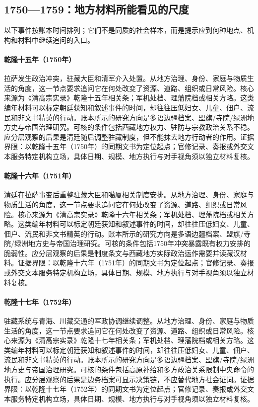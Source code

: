 \subsection{1750—1759：地方材料所能看见的尺度}
以下事件按账本时间排列；它们不是同质的社会样本，而是提示应到何种地点、机构和材料中继续追问的入口。
\hypertarget{social:EQ-1750-LHASA-UPRISING}{}\paragraph{乾隆十五年（1750年）}拉萨发生政治冲突，驻藏大臣和清军介入处置。从地方治理、身份、家庭与物质生活的角度，这一节点要求追问它在何处改变了资源、道路、组织或日常风险。核心来源为《清高宗实录》乾隆十五年相关条；军机处档、理藩院档或相关方略。这类编年材料可以标定朝廷获知和叙述事件的时间，却往往压低妇女、儿童、佃户、流民和非文书精英的行动。账本所示的研究方向是多语边疆档案、盟旗/寺院/绿洲地方史与帝国治理研究。可核的条件包括西藏地方权力、驻防与宗教政治关系不稳。应分层观察的后果是清廷随后调整驻藏制度，但不能抹去地方行动者的作用。证据界限：以乾隆十五年（1750年）的同期文书为定位起点；官修记录、奏报或外交文本服务特定机构立场，具体日期、规模、地方执行与对手视角须以独立材料复核。
\hypertarget{social:EQ-1751-TIBET-ORDINANCE}{}\paragraph{乾隆十六年（1751年）}清廷在拉萨事变后重整驻藏大臣和噶厦相关制度安排。从地方治理、身份、家庭与物质生活的角度，这一节点要求追问它在何处改变了资源、道路、组织或日常风险。核心来源为《清高宗实录》乾隆十六年相关条；军机处档、理藩院档或相关方略。这类编年材料可以标定朝廷获知和叙述事件的时间，却往往压低妇女、儿童、佃户、流民和非文书精英的行动。账本所示的研究方向是多语边疆档案、盟旗/寺院/绿洲地方史与帝国治理研究。可核的条件包括1750年冲突暴露既有权力安排的脆弱性。应分层观察的后果是制度条文与西藏地方实际政治运作需要并读藏汉材料。证据界限：以乾隆十六年（1751年）的同期文书为定位起点；官修记录、奏报或外交文本服务特定机构立场，具体日期、规模、地方执行与对手视角须以独立材料复核。
\hypertarget{social:EQ-1752-TIBETAN-ADMINISTRATION}{}\paragraph{乾隆十七年（1752年）}驻藏系统与青海、川藏交通的军政协调继续调整。从地方治理、身份、家庭与物质生活的角度，这一节点要求追问它在何处改变了资源、道路、组织或日常风险。核心来源为《清高宗实录》乾隆十七年相关条；军机处档、理藩院档或相关方略。这类编年材料可以标定朝廷获知和叙述事件的时间，却往往压低妇女、儿童、佃户、流民和非文书精英的行动。账本所示的研究方向是多语边疆档案、盟旗/寺院/绿洲地方史与帝国治理研究。可核的条件包括高原补给和多方政治关系限制中央命令的执行。应分层观察的后果是边务档案可显示决策链，不应替代地方社会证词。证据界限：以乾隆十七年（1752年）的同期文书为定位起点；官修记录、奏报或外交文本服务特定机构立场，具体日期、规模、地方执行与对手视角须以独立材料复核。
